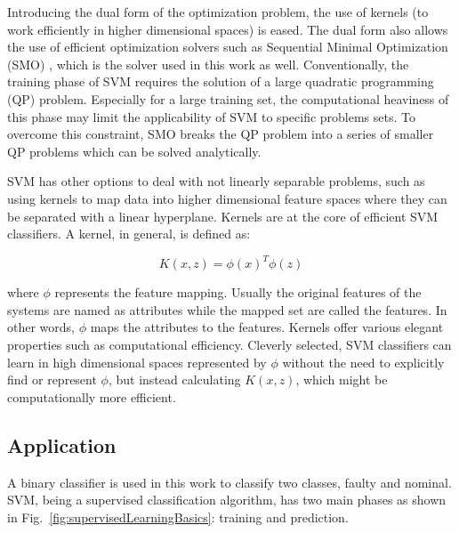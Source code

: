 Introducing the dual form of the optimization problem, the use of kernels (to work efficiently in higher dimensional spaces) is eased.
The dual form also allows the use of efficient optimization solvers such as Sequential Minimal Optimization (SMO)  \cite{platt1998sequential}, which is the solver used in this work as well. Conventionally, the training phase of SVM requires the solution of a large quadratic programming (QP) problem. Especially for a large training set, the computational heaviness of this phase may limit the applicability of SVM to specific problems sets. To overcome this constraint, SMO breaks the QP problem into a series of smaller QP problems which can be solved analytically. 


SVM has other options to deal with not linearly separable problems, such as using kernels to map data into higher dimensional feature spaces where they can be separated with a linear hyperplane. Kernels are at the core of efficient SVM classifiers. A kernel, in general, is defined as:

\begin{equation}
K (x,z) = {\phi(x)}^T \phi(z)
\end{equation}

where $\phi$ represents the feature mapping. Usually the original features of the systems are named as attributes while the mapped set are called the features. In other words, $\phi$ maps the attributes to the features. Kernels offer various elegant properties such as computational efficiency. 
Cleverly selected, SVM classifiers can learn in high dimensional spaces represented by $\phi$ without the need to explicitly find or represent $\phi$, but instead calculating $K(x,z)$, which might be computationally more efficient. 

 
\subsection{Application}


A binary classifier is used in this work to classify two classes, faulty and nominal. 
SVM, being a supervised classification algorithm, has two main phases as shown in Fig.~\ref{fig:supervisedLearningBasics}: training and prediction. 


